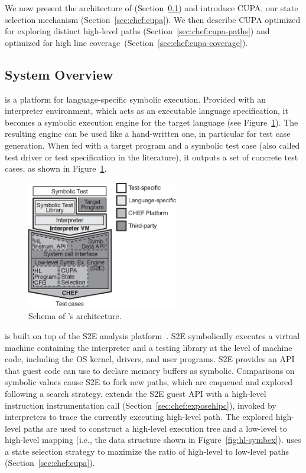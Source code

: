 We now present the architecture of \chef (Section~\ref{sec:chef:architecture}) and introduce CUPA, our state selection mechanism (Section~\ref{sec:chef:cupa}). We then describe CUPA optimized for exploring distinct high-level paths (Section~\ref{sec:chef:cupa-paths}) and optimized for high line coverage~(Section~\ref{sec:chef:cupa-coverage}).

\subsection{System Overview}
\label{sec:chef:architecture}

\chef is a platform for language-specific symbolic execution. Provided with an interpreter environment, which acts as an executable language specification, it becomes a symbolic execution engine for the target language (see Figure~\ref{fig:system-arch}).
%
The resulting engine can be used like a hand-written one, in particular for test case generation. When fed with a target program and a symbolic test case (also called test driver or test specification in the literature), it outputs a set of concrete test cases, as shown in Figure~\ref{fig:system-arch}.

\begin{figure}
  \centering
  \includegraphics[width=2.6in]{chef/figures/system-arch}
  \caption{Schema of \chef's architecture.}
  \label{fig:system-arch}
\end{figure}

\chef is built on top of the S2E analysis platform~\cite{s2eSystem}. S2E symbolically executes a virtual machine containing the interpreter and a testing library at the level of machine code,  including the OS kernel, drivers, and user programs.  S2E provides an API that guest code can use to declare memory buffers as symbolic. Comparisons on symbolic values cause S2E to fork new paths, which are enqueued and explored following a search strategy.
%
\chef extends the S2E guest API with a high-level instruction instrumentation call (Section~\ref{sec:chef:exposehlpc}), invoked by interpreters to trace the currently executing high-level path.  The explored high-level paths are used to construct a high-level execution tree and a low-level to high-level mapping (i.e., the data structure shown in Figure~\ref{fig:hl-symbex}).  \chef uses a state selection strategy to maximize the ratio of high-level to low-level paths (Section~\ref{sec:chef:cupa}).
\fi


